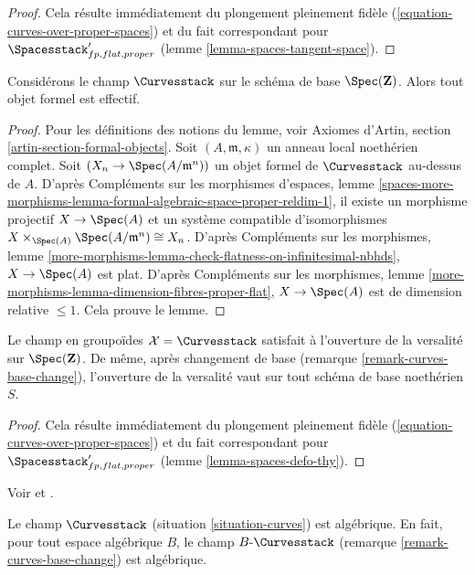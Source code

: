 \begin{proof}
Cela résulte immédiatement du plongement pleinement fidèle
(\ref{equation-curves-over-proper-spaces}) et du fait correspondant pour
$\Spacesstack'_{fp, flat, proper}$
(lemme \ref{lemma-spaces-tangent-space}).
\end{proof}

\begin{lemma}
\label{lemma-curves-existence}
Considérons le champ $\Curvesstack$ sur le schéma de base
$\Spec(\mathbf{Z})$. Alors tout objet formel est effectif.
\end{lemma}

\begin{proof}
Pour les définitions des notions du lemme, voir
Axiomes d'Artin, section \ref{artin-section-formal-objects}.
Soit $(A, \mathfrak m, \kappa)$ un anneau local noethérien complet.
Soit $(X_n \to \Spec(A/\mathfrak m^n))$ un objet formel de
$\Curvesstack$ au-dessus de $A$.
D'après Compléments sur les morphismes d'espaces, lemme
\ref{spaces-more-morphisms-lemma-formal-algebraic-space-proper-reldim-1},
il existe un morphisme projectif $X \to \Spec(A)$ et un système compatible
d'isomorphismes
$X \times_{\Spec(A)} \Spec(A/\mathfrak m^n) \cong X_n$.
D'après Compléments sur les morphismes, lemme
\ref{more-morphisms-lemma-check-flatness-on-infinitesimal-nbhds},
$X \to \Spec(A)$ est plat. D'après Compléments sur les morphismes, lemme
\ref{more-morphisms-lemma-dimension-fibres-proper-flat},
$X \to \Spec(A)$ est de dimension relative $\leq 1$.
Cela prouve le lemme.
\end{proof}

\begin{lemma}
\label{lemma-curves-defo-thy}
Le champ en groupoïdes $\mathcal{X} = \Curvesstack$ satisfait à l'ouverture
de la versalité sur $\Spec(\mathbf{Z})$.
De même, après changement de base (remarque \ref{remark-curves-base-change}),
l'ouverture de la versalité vaut sur tout schéma de base noethérien $S$.
\end{lemma}

\begin{proof}
Cela résulte immédiatement du plongement pleinement fidèle
(\ref{equation-curves-over-proper-spaces}) et du fait correspondant pour
$\Spacesstack'_{fp, flat, proper}$
(lemme \ref{lemma-spaces-defo-thy}).
\end{proof}

\begin{theorem}
\label{theorem-curves-algebraic}
\begin{reference}
Voir \cite[Proposition 3.3, page 8]{dJHS} et
\cite[Appendix B by Jack Hall, Theorem B.1]{Smyth}.
\end{reference}
Le champ $\Curvesstack$ (situation \ref{situation-curves})
est algébrique. En fait, pour tout espace algébrique $B$, le champ
$B\text{-}\Curvesstack$ (remarque \ref{remark-curves-base-change})
est algébrique.
\end{theorem}


